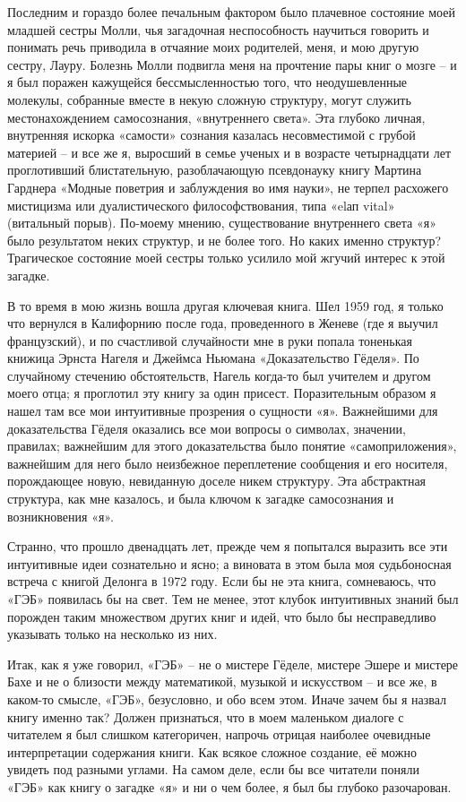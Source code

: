 \documentclass[../main.tex]{subfiles}
\begin{document}
Последним и гораздо более печальным фактором было плачевное состояние моей младшей сестры Молли, чья загадочная неспособность научиться говорить и понимать речь приводила в отчаяние моих родителей, меня, и мою другую сестру, Лауру.
Болезнь Молли подвигла меня на прочтение пары книг о мозге \--- и я был поражен кажущейся бессмысленностью того, что неодушевленные молекулы, собранные вместе в некую сложную структуру, могут служить местонахождением самосознания, «внутреннего света».
Эта глубоко личная, внутренняя искорка «самости» сознания казалась несовместимой с грубой материей \--- и все же я, выросший в семье ученых и в возрасте четырнадцати лет проглотивший блистательную, разоблачающую псевдонауку книгу Мартина Гарднера «Модные поветрия и заблуждения во имя науки», не терпел расхожего мистицизма или дуалистического философствования, типа «elап vital» (витальный порыв).
По-моему мнению, существование внутреннего света «я» было результатом неких структур, и не более того.
Но каких именно структур?
Трагическое состояние моей сестры только усилило мой жгучий интерес к этой загадке.

В то время в мою жизнь вошла другая ключевая книга.
Шел 1959 год, я только что вернулся в Калифорнию после года, проведенного в Женеве (где я выучил французский), и по счастливой случайности мне в руки попала тоненькая книжица Эрнста Нагеля и Джеймса Ньюмана «Доказательство Гёделя».
По случайному стечению обстоятельств, Нагель когда-то был учителем и другом моего отца; я проглотил эту книгу за один присест.
Поразительным образом я нашел там все мои интуитивные прозрения о сущности «я».
Важнейшими для доказательства Гёделя оказались все мои вопросы о символах, значении, правилах; важнейшим для этого доказательства было понятие «самоприложения», важнейшим для него было неизбежное переплетение сообщения и его носителя, порождающее новую, невиданную доселе никем структуру.
Эта абстрактная структура, как мне казалось, и была ключом к загадке самосознания и возникновения «я».

Странно, что прошло двенадцать лет, прежде чем я попытался выразить все эти интуитивные идеи сознательно и ясно; а виновата в этом была моя судьбоносная встреча с книгой Делонга в 1972 году.
Если бы не эта книга, сомневаюсь, что «ГЭБ» появилась бы на свет.
Тем не менее, этот клубок интуитивных знаний был порожден таким множеством других книг и идей, что было бы несправедливо указывать только на несколько из них.

Итак, как я уже говорил, «ГЭБ» \--- не о мистере Гёделе, мистере Эшере и мистере Бахе и не о близости между математикой, музыкой и искусством \--- и все же, в каком-то смысле, «ГЭБ», безусловно, и обо всем этом.
Иначе зачем бы я назвал книгу именно так?
Должен признаться, что в моем маленьком диалоге с читателем я был слишком категоричен, напрочь отрицая наиболее очевидные интерпретации содержания книги.
Как всякое сложное создание, её можно увидеть под разными углами.
На самом деле, если бы все читатели поняли «ГЭБ» как книгу о загадке «я» и ни о чем более, я был бы глубоко разочарован.
\end{document}
